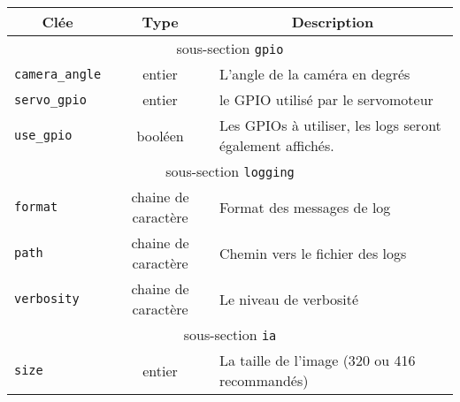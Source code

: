 \begin{table}[H]
    \begin{tabularx}{\linewidth}{|l|c|X|}
        \hline
        \multicolumn{1}{|c|}{\cellcolor{tableColorDark}Clée} & \multicolumn{1}{c|}{\cellcolor{tableColorDark}Type} & \multicolumn{1}{c|}{\cellcolor{tableColorDark}Description} \\ \hline
        \multicolumn{3}{|c|}{\cellcolor{tableColorDark}sous-section \texttt{gpio}}                                                                                              \\ \hline
        \texttt{camera\_angle}                               & entier                                              & L'angle de la caméra en degrés                             \\ \hline
        \texttt{servo\_gpio}                                 & entier                                              & le GPIO utilisé par le servomoteur                         \\ \hline
        \texttt{use\_gpio}                                   & booléen                                             & Les GPIOs à utiliser, les logs seront également affichés.  \\ \hline
        \multicolumn{3}{|c|}{\cellcolor{tableColorDark}sous-section \texttt{logging}}                                                                                           \\ \hline
        \texttt{format}                                      & chaine de caractère                                 & Format des messages de log \cite{loggingFormat}            \\ \hline
        \texttt{path}                                        & chaine de caractère                                 & Chemin vers le fichier des logs                            \\ \hline
        \texttt{verbosity}                                   & chaine de caractère                                 & Le niveau de verbosité                                     \\ \hline
        \multicolumn{3}{|c|}{\cellcolor{tableColorDark}sous-section \texttt{ia}}                                                                                                \\ \hline
        \texttt{size}                                        & entier                                              & La taille de l'image (320 ou 416 recommandés)              \\ \hline

\end{tabularx}
\end{table}
